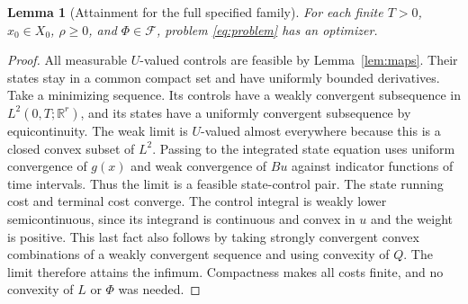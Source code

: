 \documentclass[11pt,a4paper]{article}
\newtheorem{lemma}[theorem]{Lemma}
\newcommand{\R}{\mathbb R}
\begin{document}
\begin{lemma}[Attainment for the full specified family]\label{lem:existence}
For each finite $T>0$, $x_0\in X_0$, $\rho\geq0$, and
$\Phi\in\mathcal F$, problem \eqref{eq:problem} has an optimizer.
\end{lemma}
\begin{proof}
All measurable $U$-valued controls are feasible by Lemma~\ref{lem:maps}.
Their states stay in a common compact set and have uniformly bounded
derivatives. Take a minimizing sequence. Its controls have a weakly
convergent subsequence in $L^2(0,T;\R^r)$, and its states have a uniformly
convergent subsequence by equicontinuity. The weak limit is $U$-valued
almost everywhere because this is a closed convex subset of $L^2$.
Passing to the integrated state equation uses uniform convergence of
$g(x)$ and weak convergence of $Bu$ against indicator functions of time
intervals. Thus the limit is a feasible state-control pair.
The state running cost and terminal cost converge. The control integral
is weakly lower semicontinuous, since its integrand is continuous and
convex in $u$ and the weight is positive. This last fact also follows
by taking strongly convergent convex combinations of a weakly convergent
sequence and using convexity of $Q$. The limit therefore attains the
infimum. Compactness makes all costs finite, and no convexity of $L$ or
$\Phi$ was needed.
\end{proof}
\end{document}
